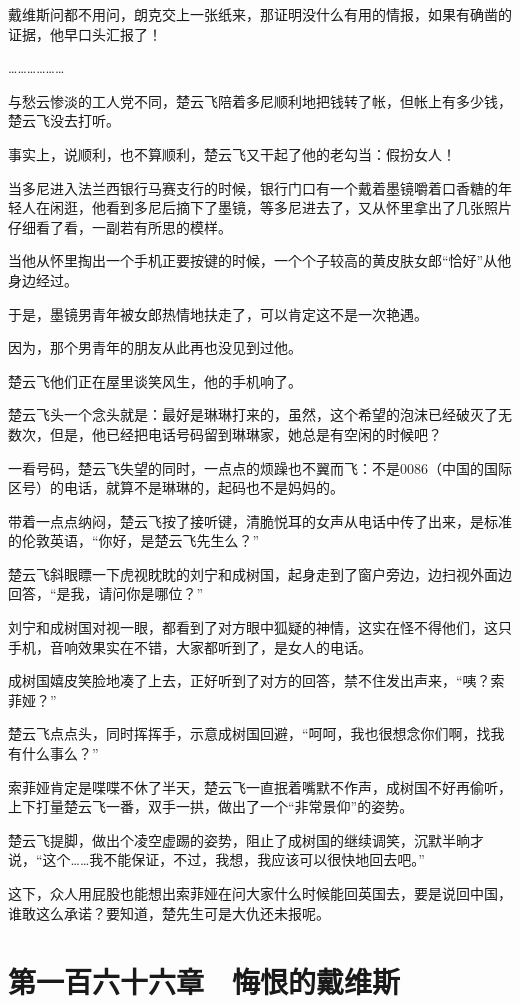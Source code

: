 戴维斯问都不用问，朗克交上一张纸来，那证明没什么有用的情报，如果有确凿的证据，他早口头汇报了！

………………

与愁云惨淡的工人党不同，楚云飞陪着多尼顺利地把钱转了帐，但帐上有多少钱，楚云飞没去打听。

事实上，说顺利，也不算顺利，楚云飞又干起了他的老勾当：假扮女人！

当多尼进入法兰西银行马赛支行的时候，银行门口有一个戴着墨镜嚼着口香糖的年轻人在闲逛，他看到多尼后摘下了墨镜，等多尼进去了，又从怀里拿出了几张照片仔细看了看，一副若有所思的模样。

当他从怀里掏出一个手机正要按键的时候，一个个子较高的黄皮肤女郎“恰好”从他身边经过。

于是，墨镜男青年被女郎热情地扶走了，可以肯定这不是一次艳遇。

因为，那个男青年的朋友从此再也没见到过他。

楚云飞他们正在屋里谈笑风生，他的手机响了。

楚云飞头一个念头就是：最好是琳琳打来的，虽然，这个希望的泡沫已经破灭了无数次，但是，他已经把电话号码留到琳琳家，她总是有空闲的时候吧？

一看号码，楚云飞失望的同时，一点点的烦躁也不翼而飞：不是0086（中国的国际区号）的电话，就算不是琳琳的，起码也不是妈妈的。

带着一点点纳闷，楚云飞按了接听键，清脆悦耳的女声从电话中传了出来，是标准的伦敦英语，“你好，是楚云飞先生么？”

楚云飞斜眼瞟一下虎视眈眈的刘宁和成树国，起身走到了窗户旁边，边扫视外面边回答，“是我，请问你是哪位？”

刘宁和成树国对视一眼，都看到了对方眼中狐疑的神情，这实在怪不得他们，这只手机，音响效果实在不错，大家都听到了，是女人的电话。

成树国嬉皮笑脸地凑了上去，正好听到了对方的回答，禁不住发出声来，“咦？索菲娅？”

楚云飞点点头，同时挥挥手，示意成树国回避，“呵呵，我也很想念你们啊，找我有什么事么？”

索菲娅肯定是喋喋不休了半天，楚云飞一直抿着嘴默不作声，成树国不好再偷听，上下打量楚云飞一番，双手一拱，做出了一个“非常景仰”的姿势。

楚云飞提脚，做出个凌空虚踢的姿势，阻止了成树国的继续调笑，沉默半晌才说，“这个……我不能保证，不过，我想，我应该可以很快地回去吧。”

这下，众人用屁股也能想出索菲娅在问大家什么时候能回英国去，要是说回中国，谁敢这么承诺？要知道，楚先生可是大仇还未报呢。

\section{第一百六十六章　悔恨的戴维斯}

